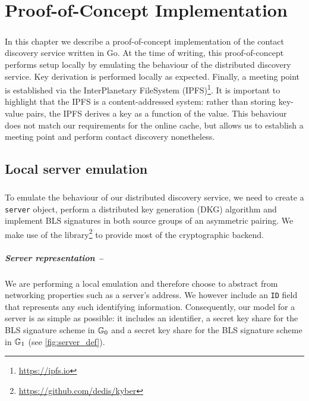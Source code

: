 \chapter{Proof-of-Concept Implementation}
\label{implementation}


\paragraph{} In this chapter we describe a proof-of-concept implementation of the contact discovery service written in Go. At the time of writing, this proof-of-concept performs setup locally by emulating the behaviour of the distributed discovery service. Key derivation is performed locally as expected. Finally, a meeting point is established via the InterPlanetary FileSystem (IPFS)\footnote{\url{https://ipfs.io}}. It is important to highlight that the IPFS is a content-addressed system: rather than storing key-value pairs, the IPFS derives a key as a function of the value. This behaviour does not match our requirements for the online cache, but allows us to establish a meeting point and perform contact discovery nonetheless.




\section{Local server emulation}

	\paragraph{} To emulate the behaviour of our distributed discovery service, we need to create a \texttt{server} object, perform a distributed key generation (DKG) algorithm and implement BLS signatures in both source groups of an asymmetric pairing. We make use of the \kyber \;library\footnote{\url{https://github.com/dedis/kyber}} to provide most of the cryptographic backend.
	
	\paragraph{Server representation --} We are performing a local emulation and therefore choose to abstract from networking properties such as a server's address. We however include an \texttt{ID} field that represents any such identifying information. Consequently, our model for a server is as simple as possible: it includes an identifier, a secret key share for the BLS signature scheme in $\mathbb{G}_0$ and a secret key share for the BLS signature scheme in $\mathbb{G}_1$ (see \autoref{fig:server_def}).
	
